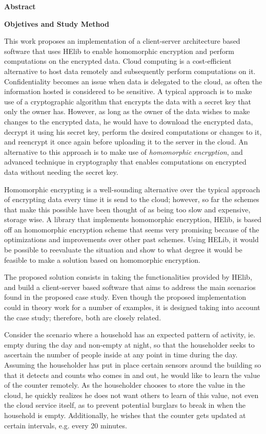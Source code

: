 \textbf{Abstract}
\label{abstract}

\textbf{Objetives and Study Method}

This work proposes an implementation of a client-server architecture based software that uses HElib to enable homomorphic encryption and perform computations on the encrypted data. Cloud computing is a cost-efficient alternative to host data remotely and subsequently perform computations on it. Confidentiality becomes an issue when data is delegated to the cloud, as often the information hosted is considered to be sensitive. A typical approach is to make use of a cryptographic algorithm that encrypts the data with a secret key that only the owner has. However, as long as the owner of the data wishes to make changes to the encrypted data, he would have to download the encrypted data, decrypt it using his secret key, perform the desired computations or changes to it, and reencrypt it once again before uploading it to the server in the cloud. An alternative to this approach is to make use of \emph{homomorphic encryption}, and advanced technique in cryptography that enables computations on encrypted data without needing the secret key. 

Homomorphic encrypting is a well-sounding alternative over the typical approach of encrypting data every time it is send to the cloud; however, so far the schemes that make this possible have been thought of as being too slow and expensive, storage wise. A library that implements homomorphic encryption, HElib, is based off an homomorphic encryption scheme that seems very promising because of the optimizations and improvements over other past schemes. Using HELib, it would be possible to reevaluate the situation and show to what degree it would be feasible to make a solution based on homomorphic encryption.

The proposed solution consists in taking the functionalities provided by HElib, and build a client-server based software that aims to address the main scenarios found in the proposed case study. Even though the proposed implementation could in theory work for a number of examples, it is designed taking into account the case study; therefore, both are closely related.

Consider the scenario where a household has an expected pattern of activity, ie. empty during the day and non-empty at night, so that the householder seeks to ascertain the number of people inside at any point in time during the day. Assuming the householder has put in place certain sensors around the building so that it detects and counts who comes in and out, he would like to learn the value of the counter remotely. As the householder chooses to store the value in the cloud, he quickly realizes he does not want others to learn of this value, not even the cloud service itself, as to prevent potential burglars to break in when the household is empty. Additionally, he wishes that the counter gets updated at certain intervals, e.g. every 20 minutes. 


